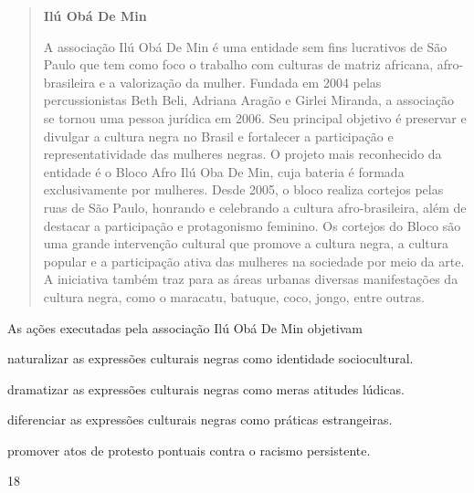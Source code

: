 \begin{quote}
\textbf{Ilú Obá De Min}

A associação Ilú Obá De Min é uma entidade sem fins lucrativos de São Paulo que tem como foco o trabalho com culturas de matriz africana, afro-brasileira e a valorização da mulher. Fundada em 2004 pelas percussionistas Beth Beli, Adriana Aragão e Girlei Miranda, a associação se tornou uma pessoa jurídica em 2006. Seu principal objetivo é preservar e divulgar a cultura negra no Brasil e fortalecer a participação e representatividade das mulheres negras. O projeto mais reconhecido da entidade é o Bloco Afro Ilú Oba De Min, cuja bateria é formada exclusivamente por mulheres. Desde 2005, o bloco realiza cortejos pelas ruas de São Paulo, honrando e celebrando a cultura afro-brasileira, além de destacar a participação e protagonismo feminino. Os cortejos do Bloco são uma grande intervenção cultural que promove a cultura negra, a cultura popular e a participação ativa das mulheres na sociedade por meio da arte. A iniciativa também traz para as áreas urbanas diversas manifestações da cultura negra, como o maracatu, batuque, coco, jongo, entre outras.

\end{quote}

As ações executadas pela associação Ilú Obá De Min objetivam

\begin{escolha}
\item  naturalizar as expressões culturais negras como identidade
    sociocultural.
\item  dramatizar as expressões culturais negras como meras atitudes
    lúdicas.
\item  diferenciar as expressões culturais negras como práticas
    estrangeiras.
\item  promover atos de protesto pontuais contra o racismo persistente.
\end{escolha}

\pagebreak
\num{18}

